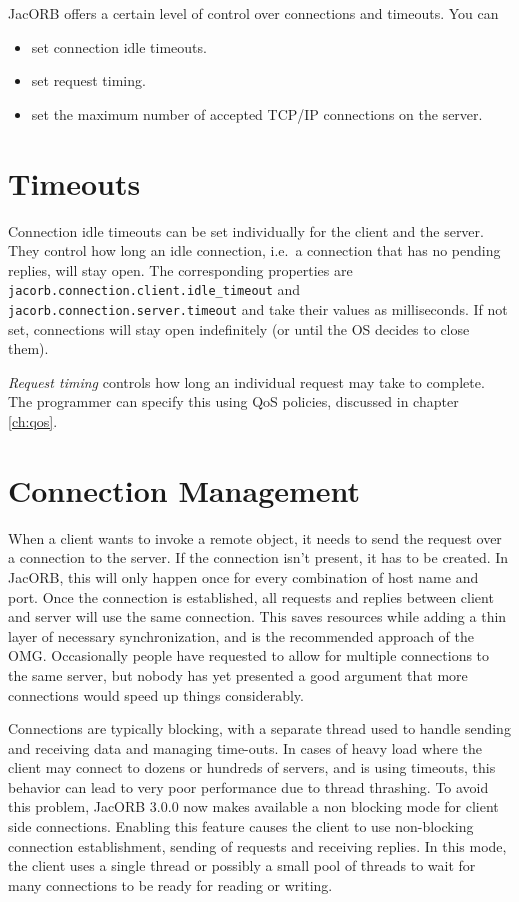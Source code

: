 
JacORB offers a certain level of control over connections and timeouts. You
can
\begin{itemize}
\item set connection idle timeouts.
\item set request timing.
\item set the maximum number of accepted TCP/IP connections on the server.
\end{itemize}

\section{Timeouts}
\label{connection_timeouts}
Connection idle timeouts can be set individually for the client and the
server. They control how long an idle connection, i.e.~a connection that has
no pending replies, will stay open. The corresponding properties are {\tt
  jacorb.connection.client.idle\_timeout} and {\tt
  jacorb.connection.server.timeout} and take their values as milliseconds. If
not set, connections will stay open indefinitely (or until the OS decides to
close them).

\emph{Request timing} controls how long an individual request may take to
complete.  The programmer can specify this using QoS policies,
discussed in chapter \ref{ch:qos}.

\section{Connection Management}
\label{connection_management}

When a client wants to invoke a remote object, it needs to send the request
over a connection to the server. If the connection isn't present, it has to be
created. In JacORB, this will only happen once for every combination of host
name and port. Once the connection is established, all requests and replies
between client and server will use the same connection. This saves resources
while adding a thin layer of necessary synchronization, and is the recommended
approach of the OMG. Occasionally people have requested to allow for multiple
connections to the same server, but nobody has yet presented a good argument
that more connections would speed up things considerably.

Connections are typically blocking, with a separate thread used to handle
sending and receiving data and managing time-outs. In cases of heavy load
where the client may connect to dozens or hundreds of servers, and is using
timeouts, this behavior can lead to very poor performance due to thread
thrashing. To avoid this problem, JacORB 3.0.0 now makes available a non\-
blocking mode for client side connections. Enabling this feature causes the
client to use non-blocking connection establishment, sending of requests and
receiving replies. In this mode, the client uses a single thread or possibly a
small pool of threads to wait for many connections to be ready for reading
or writing.

